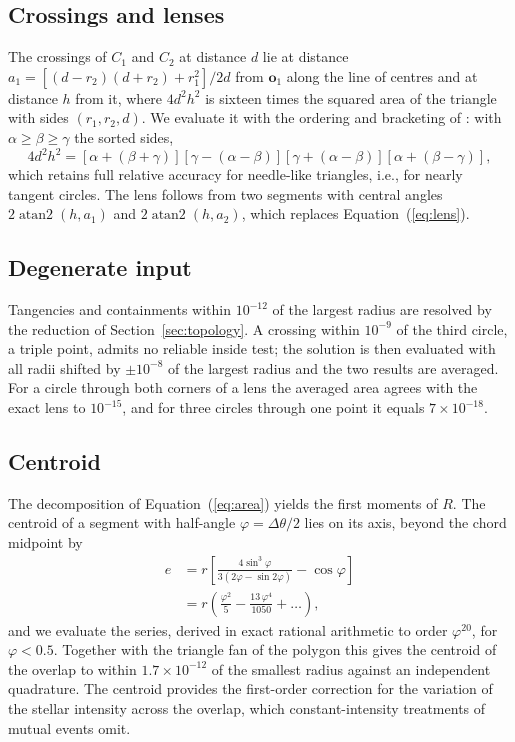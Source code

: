 \documentclass[twocolumn]{aastex701}
\newcommand{\dth}{\Delta\theta}
\begin{document}
\subsection{Crossings and lenses} \label{sec:crossings}

The crossings of $C_1$ and $C_2$ at distance $d$ lie at distance
$a_1=[(d-r_2)(d+r_2)+r_1^2]/2d$ from $\mathbf{o}_1$ along the line of
centres and at distance $h$ from it, where $4d^2h^2$ is sixteen times the
squared area of the triangle with sides $(r_1,r_2,d)$. We evaluate it
with the ordering and bracketing of \citet{Kahan2014}: with
$\alpha\ge\beta\ge\gamma$ the sorted sides,
\begin{equation}
4d^2h^2=[\alpha+(\beta+\gamma)][\gamma-(\alpha-\beta)][\gamma+(\alpha-\beta)][\alpha+(\beta-\gamma)],
\label{eq:kahan}
\end{equation}
which retains full relative accuracy for needle-like triangles, i.e., for
nearly tangent circles. The lens follows from two segments with central
angles $2\operatorname{atan2}(h,a_1)$ and $2\operatorname{atan2}(h,a_2)$,
which replaces Equation~(\ref{eq:lens}).

\subsection{Degenerate input} \label{sec:degenerate}

Tangencies and containments within $10^{-12}$ of the largest radius
are resolved by the reduction of Section~\ref{sec:topology}. A crossing
within $10^{-9}$ of the third circle, a triple point, admits no reliable
inside test; the solution is then evaluated with all radii shifted by
$\pm10^{-8}$ of the largest radius and the two results are averaged. For a
circle through both corners of a lens the averaged area agrees with the
exact lens to $10^{-15}$, and for three circles through one point it
equals $7\times10^{-18}$.

\subsection{Centroid} \label{sec:centroid}

The decomposition of Equation~(\ref{eq:area}) yields the first moments of
$R$. The centroid of a segment with half-angle $\varphi=\dth/2$ lies on
its axis, beyond the chord midpoint by
\begin{equation}
\begin{split}
e&=r\left[\frac{4\sin^3\varphi}{3(2\varphi-\sin2\varphi)}-\cos\varphi\right]\\
&= r\left(\frac{\varphi^2}{5}-\frac{13\,\varphi^4}{1050}+\ldots\right),
\end{split}
\label{eq:centroid}
\end{equation}
and we evaluate the series, derived in exact rational arithmetic to order
$\varphi^{20}$, for $\varphi<0.5$. Together with the triangle fan of the
polygon this gives the centroid of the overlap to within $1.7\times10^{-12}$
of the smallest radius against an independent quadrature. The centroid
provides the first-order correction for the variation of the stellar
intensity across the overlap, which constant-intensity treatments of
mutual events omit.
\end{document}
